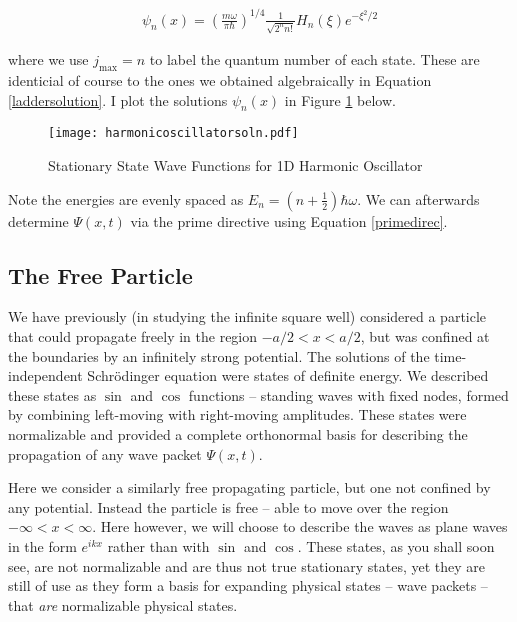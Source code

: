 \begin{align} \label{powerseriessoln}
  \psi_n(x) = \left( \frac{m\omega}{\pi \hbar}\right)^{1/4} \frac{1}{\sqrt{2^n
  n!}} H_n(\xi) e^{-\xi^2 / 2}
\end{align}\vspace{3px}

where we use $j_\text{max} = n$ to label the quantum number of each state. These are identicial of course to the ones we obtained algebraically in
Equation \ref{laddersolution}. I plot the solutions $\psi_n(x)$ in Figure
\ref{graphsoln} below. 

\begin{figure}[!ht]
  \centering
    \texttt{[image: harmonicoscillatorsoln.pdf]}
    \caption{Stationary State Wave Functions for 1D Harmonic Oscillator}
    \label{graphsoln}
\end{figure}

Note the energies are evenly spaced as $E_n = \left( n + \frac{1}{2} \right)
\hbar\omega $. We can afterwards determine $\Psi(x, t)$ via the prime
directive using Equation \ref{primedirec}. 

\subsection{The Free Particle}

We have previously (in studying the infinite square well) considered a particle
that could propagate freely in the region $-a/2 < x < a/2$, but was confined at
the boundaries by an infinitely strong potential. The solutions of the
time-independent Schr\"odinger equation were states of definite energy. We
described these states as $\sin$ and $\cos$ functions -- standing waves with
fixed nodes, formed by combining left-moving with right-moving amplitudes.
These states were normalizable and provided a complete orthonormal basis for
describing the propagation of any wave packet $\Psi(x, t)$. 

Here we consider a similarly free propagating particle, but one not confined by
any potential. Instead the particle is free -- able to move over the region
$-\infty < x < \infty$. Here however, we will choose to describe the waves as
plane waves in the form $e^{ikx}$ rather than with $\sin$ and $\cos$. These
states, as you shall soon see, are not normalizable and are thus not true
stationary states, yet they are still of use as they form a basis for expanding
physical states -- wave packets -- that \textit{are} normalizable physical
states. 

